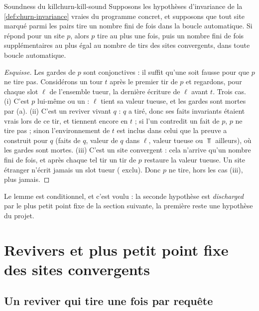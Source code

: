 \begin{lemme}{Soundness du kill}{churn-kill-sound}
Supposons les hypothèses d'invariance de la \cref{def:churn-invariance} vraies du programme
concret, et supposons que tout site marqué  parmi les pairs tire un nombre
fini de fois dans la boucle automatique. Si  répond
 pour un site $p$, alors $p$ tire au plus une fois, puis un nombre fini de fois
supplémentaires au plus égal au nombre de tirs des sites convergents, dans toute boucle
automatique.
\end{lemme}
\begin{proof}[Esquisse]
Les gardes de $p$ sont conjonctives : il suffit qu'une soit fausse pour que $p$ ne tire pas.
Considérons un tour $t$ après le premier tir de $p$ et regardons, pour chaque slot $\ell$ de
l'ensemble tueur, la dernière écriture de $\ell$ avant $t$. Trois cas. (i) C'est $p$
lui-même ou un  : $\ell$ tient sa valeur tueuse, et les gardes sont mortes par (a).
(ii) C'est un reviver vivant $q$ : $q$ a tiré, donc ses faits invariants étaient vrais lors
de ce tir, et tiennent encore en $t$ ; si l'un contredit un fait de $p$, $p$ ne tire pas ;
sinon l'environnement de $t$ est inclus dans celui que la preuve a construit pour $q$
(faits de $q$, valeur de $q$ dans $\ell$, valeur tueuse ou $\Top$ ailleurs), où les gardes
sont mortes. (iii) C'est un site convergent : cela n'arrive qu'un nombre fini de fois, et
après chaque tel tir un tir de $p$ restaure la valeur tueuse. Un site étranger n'écrit
jamais un slot tueur ( exclu). Donc $p$ ne tire, hors les cas (iii), plus
jamais.
\end{proof}

Le lemme est conditionnel, et c'est voulu : la seconde hypothèse est \emph{discharged} par
le plus petit point fixe de la section suivante, la première reste une hypothèse du
projet.

\section{Revivers et plus petit point fixe des sites convergents}
\label{sec:churn-point-fixe}

\subsection{Un reviver qui tire une fois par requête}

